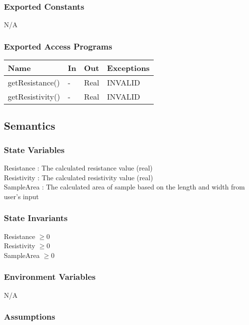 \documentclass[12pt, titlepage]{article}
\begin{document}
\subsubsection{Exported Constants}
N/A

\subsubsection{Exported Access Programs}

\begin{center}
\begin{tabular}{p{4cm} p{2cm} p{4cm} p{2cm}}
\hline
\textbf{Name} & \textbf{In} & \textbf{Out} & \textbf{Exceptions} \\
\hline
getResistance() & - & Real & INVALID \\
getResistivity() & - & Real & INVALID \\
\hline
\end{tabular}
\end{center}

\subsection{Semantics}

\subsubsection{State Variables}

Resistance : The calculated resistance value (real)\\
Resistivity : The calculated resistivity value (real) \\
SampleArea : The calculated area of sample based on the length and width from user's input

\subsubsection{State Invariants}

Resistance $\geq 0$ \\
Resistivity $\geq 0$ \\
SampleArea $\geq 0$

\subsubsection{Environment Variables}

N/A

\subsubsection{Assumptions}
\end{document}
